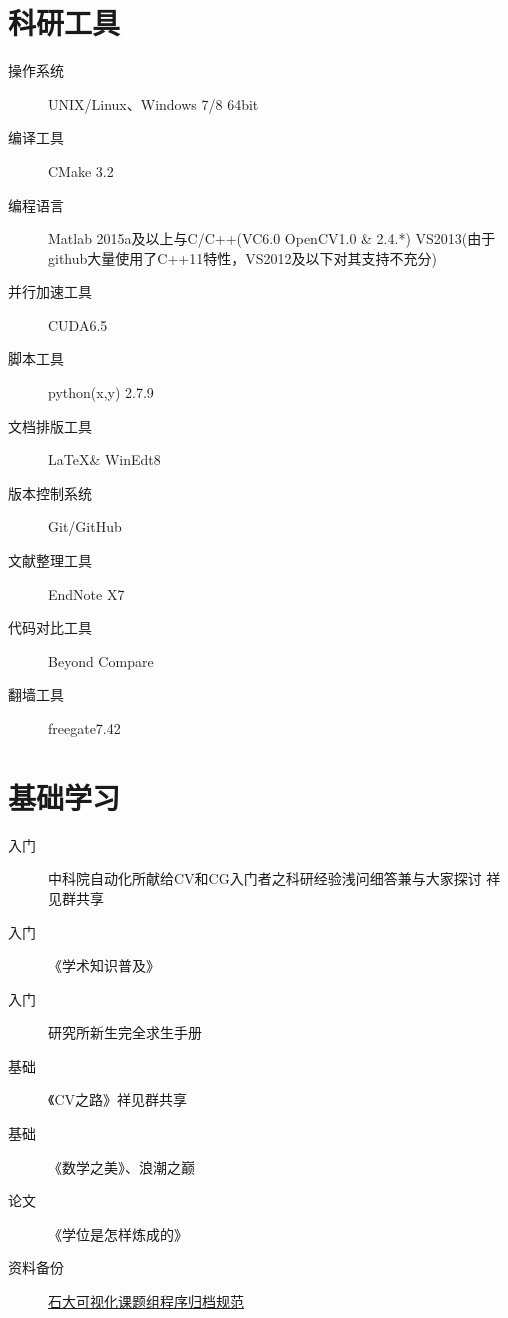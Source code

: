 \documentclass[a4paper，12pt]{article}
\begin{document}
\section{科研工具}

\begin{description}

\item[操作系统] UNIX/Linux、Windows 7/8 64bit

\item[编译工具] CMake 3.2

\item[编程语言] Matlab 2015a及以上与C/C++(VC6.0 OpenCV1.0 \& 2.4.*) VS2013(由于github大量使用了C++11特性，VS2012及以下对其支持不充分)

\item[并行加速工具] CUDA6.5

\item[脚本工具] python(x,y) 2.7.9

\item[文档排版工具] \LaTeX \& WinEdt8

\item[版本控制系统] Git/GitHub

\item[文献整理工具] EndNote X7

\item[代码对比工具] Beyond Compare

\item[翻墙工具] freegate7.42

\end{description}

\section{基础学习}

\begin{description}

\item[入门]中科院自动化所献给CV和CG入门者之科研经验浅问细答兼与大家探讨 祥见群共享

\item[入门]《学术知识普及》

\item[入门] 研究所新生完全求生手册

\item[基础]《CV之路》祥见群共享

\item[基础]《数学之美》、浪潮之巅

\item[论文]《学位是怎样炼成的》

\item[资料备份] \href{https://github.com/imistyrain/UPCRules}{石大可视化课题组程序归档规范}

\end{description}
\end{document}
